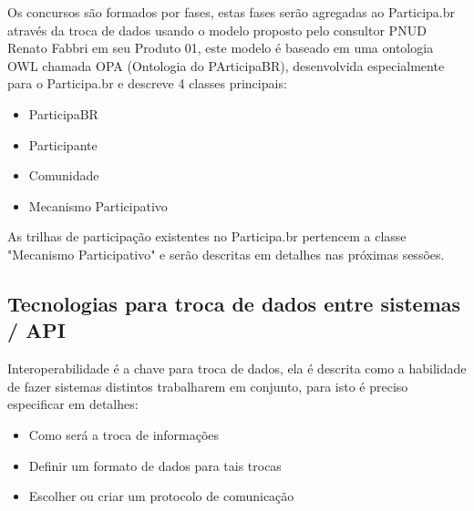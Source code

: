 \documentclass[12pt]{article}
\begin{document}
Os concursos são formados por fases, estas fases serão agregadas ao
Participa.br através da troca de dados usando o modelo proposto pelo consultor
PNUD Renato Fabbri em seu Produto 01\cite{fabri}, este modelo é baseado em uma
ontologia OWL chamada OPA (Ontologia do PArticipaBR), desenvolvida
especialmente para o Participa.br e descreve 4 classes principais:

\begin{itemize}
  \item ParticipaBR
  \item Participante
  \item Comunidade
  \item Mecanismo Participativo
\end{itemize}

As trilhas de participação existentes no Participa.br pertencem a classe "Mecanismo
Participativo" e serão descritas em detalhes nas próximas sessões.

\subsection{Tecnologias para troca de dados entre sistemas / API}

%
%


Interoperabilidade é a chave para troca de dados, ela é descrita como a
habilidade de fazer sistemas distintos trabalharem em conjunto, para isto é
preciso especificar em detalhes:

\begin{itemize}
  \item Como será a troca de informações
  \item Definir um formato de dados para tais trocas
  \item Escolher ou criar um protocolo de comunicação
\end{itemize}
\end{document}
